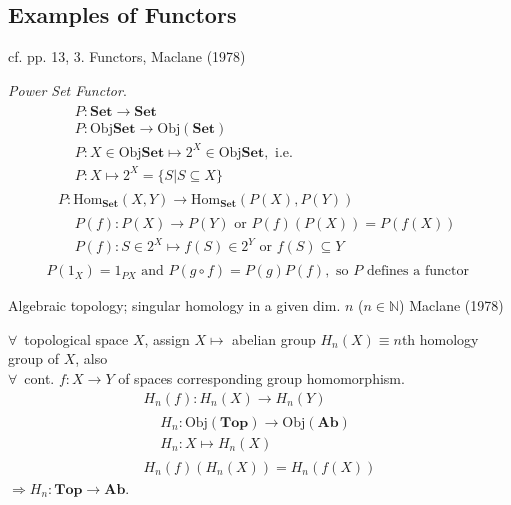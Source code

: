\subsection{Examples of Functors}

cf. pp. 13, 3. Functors, Maclane (1978) \cite{agat:MacL1978}

\emph{Power Set Functor}. 
\[
\begin{gathered}
	\begin{aligned}
		& P : \textbf{Set} \to \textbf{Set} \\
		& P:\text{Obj}\textbf{Set} \to \text{Obj}(\textbf{Set}) \\
		& P: X \in \text{Obj}\textbf{Set} \mapsto 2^X \in \text{Obj}\textbf{Set}, \text{ i.e. } \\
		& P:X \mapsto 2^X = \lbrace S | S \subseteq X \rbrace 
	\end{aligned} \\
P : \text{Hom}_{\textbf{Set}}(X,Y) \to \text{Hom}_{\textbf{Set}}(P(X), P(Y)) \\
\begin{aligned} 
& P(f): P(X) \to P(Y) \text{ or } P(f)(P(X)) = P(f(X)) \\
& P(f): S \in 2^X \mapsto f(S) \in 2^Y \text{ or } f(S) \subseteq Y 
\end{aligned} 
\end{gathered}
\]
\[
\begin{gathered}
P(1_X) = 1_{PX} \text{ and } P(g\circ f) = P(g) P(f), \text{ so $P$ defines a functor }
\end{gathered}
\]

Algebraic topology; singular homology in a given dim. $n$ ($n \in \mathbb{N}$) Maclane (1978) \cite{agat:MacL1978}

$\forall \, $ topological space $X$, assign $X \mapsto $ abelian group $H_n(X) \equiv n$th homology group of $X$, also \\
$\forall \, $ cont. $f:X \to Y$ of spaces corresponding group homomorphism. 
\[
\begin{gathered}
H_n(f) : H_n(X) \to H_n(Y) \\
\begin{aligned}
& H_n: \text{Obj}(\mathbf{Top}) \to \text{Obj}(\textbf{Ab}) \\
& H_n: X \mapsto H_n(X) 
\end{aligned} \\
H_n(f)(H_n(X)) = H_n(f(X))
\end{gathered}
\]
$\Longrightarrow H_n: \textbf{Top} \to \textbf{Ab}$.

